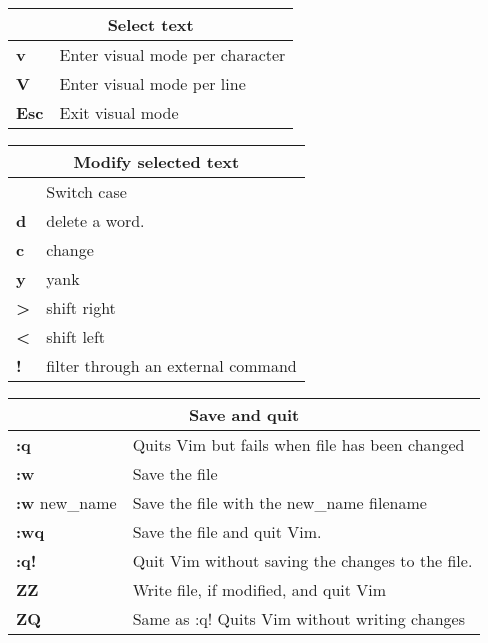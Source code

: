 \begin{table}[h]
\centering
\footnotesize
\begin{tabular}{|l|l|}
\multicolumn{2}{c}{\textbf{Select text}}\\
\hline
\textbf{v} & {Enter visual mode per character}\\
\hline
\textbf{V} & {Enter visual mode per line}\\
\hline
\textbf{Esc} & {Exit visual mode}\\
\hline
\end{tabular}
\end{table}

\begin{table}[h]
\centering
\footnotesize
\begin{tabular}{|l|l|}
\multicolumn{2}{c}{\textbf{Modify selected text}}\\
\hline
\textbf{~}	& {Switch case}\\
\hline
\textbf{d}	& {delete a word.}\\
\hline
\textbf{c}	& {change}\\
\hline
\textbf{y}	& {yank}\\
\hline
\textbf{>}	& {shift right}\\
\hline
\textbf{<}	& {shift left}\\
\hline
\textbf{!}	& {filter through an external command}\\
\hline
\end{tabular}
\end{table}

\begin{table}[h]
\centering
\footnotesize
\begin{tabular}{|l|l|}
\multicolumn{2}{c}{\textbf{Save and quit}}\\
\hline
\textbf{:q}	& {Quits Vim but fails when file has been changed}\\
\hline
\textbf{:w}	& {Save the file}\\
\hline
{\textbf{:w} new\_name} & {Save the file with the new\_name filename}\\
\hline
\textbf{:wq} & {Save the file and quit Vim.}\\
\hline
\textbf{:q!} & {Quit Vim without saving the changes to the file.}\\
\hline
\textbf{ZZ}	& {Write file, if modified, and quit Vim}\\
\hline
\textbf{ZQ}	& {Same as :q! Quits Vim without writing changes}\\
\hline
\end{tabular}
\end{table}

